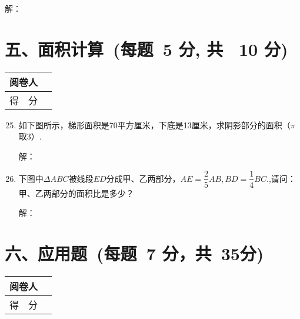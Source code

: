 \documentclass[twocolumn,landscape,UTF8]{ctexart}
\newcommand{\putzdx}{\marginpar{
		\parbox{1cm}{\vspace{-1.6cm}
			\rotatebox[origin=c]{90}{
				\usebox{\zdx}
		}}
}}
\begin{document}
\begin{spacing}{1.3}
\begin{enumerate}
        解：
        \vspace{2.5cm} 
\end{enumerate}
\newpage
\section*{\hspace{5cm} 五、面积计算~(每题~5 分, 共~ 10 分)}
\vspace{-1cm}
\begin{tabular}{|p{}|p{}|}
\hline
\centering 阅卷人& \\
\hline
\centering 得~~分 &  \\
\hline
\end{tabular}
		
		\begin{enumerate}\setcounter{enumi}{24}
			\item 如下图所示，梯形面积是70平方厘米，下底是13厘米，求阴影部分的面积（$\pi$取3）.
			
			解：
            \vspace{2.5cm}
			
			\item 下图中$\Delta ABC$被线段$ED$分成甲、乙两部分，$AE=\dfrac{2}{5}AB,BD=\dfrac{1}{4}BC.$,请问：甲、乙两部分的面积比是多少？

           解：
            \vspace{2.5cm}
			

			
		\end{enumerate}
		\newpage
		\putzdx %
		\section*{\hspace{5cm} 六、应用题~(每题~7 分，共~35分)}
		\vspace{-1cm}
		\begin{tabular}{|p{}|p{}|}
			\hline
			\centering  阅卷人& \\
			\hline
			\centering 得~~分 &  \\
			\hline
		\end{tabular}

		\begin{enumerate}\setcounter{enumi}{26}


\end{enumerate}
\end{spacing}
\end{document}

